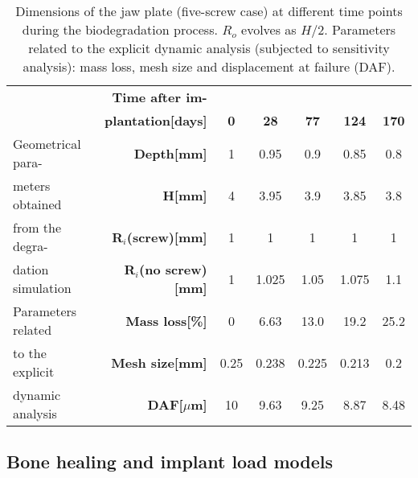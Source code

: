 \begin{table}[h]
\centering
\small
\begin{tabular}{|l|r|ccccc|}
\hline
                   & \textbf{Time after im-}          &            &             &             &              &              \\
                   & \textbf{plantation{[}days{]}}    & \textbf{0} & \textbf{28} & \textbf{77} & \textbf{124} & \textbf{170} \\ \hline
Geometrical para-  & \textbf{Depth{[}mm{]}}           & 1          & 0.95        & 0.9         & 0.85         & 0.8          \\
meters obtained    & \textbf{H{[}mm{]}}               & 4          & 3.95        & 3.9         & 3.85         & 3.8          \\
from the degra-    & \textbf{R$_i$(screw){[}mm{]}}    & 1          & 1           & 1           & 1            & 1            \\
dation simulation  & \textbf{R$_i$(no screw){[}mm{]}} & 1          & 1.025       & 1.05        & 1.075        & 1.1          \\ \hline
Parameters related & \textbf{Mass loss{[}\%{]}}       & 0          & 6.63        & 13.0        & 19.2         & 25.2         \\
to the explicit    & \textbf{Mesh size{[}mm{]}}       & 0.25       & 0.238      & 0.225        & 0.213        & 0.2          \\
dynamic analysis   & \textbf{{DAF}{[$\mu$}m{]}}         & 10         & 9.63        & 9.25        & 8.87         & 8.48         \\ \hline
\end{tabular}
\caption[Dimensions of the jaw plate at different time points during the biodegradation process]{Dimensions of the jaw plate (five-screw case) at different time points during the biodegradation process. $R_o$ evolves as $H/2$. Parameters related to the explicit dynamic analysis (subjected to sensitivity analysis): mass loss, mesh size and displacement at failure ({DAF}).}
\label{tab:BPdim}
\end{table}


\subsection{Bone healing and implant load models}
\label{sec:bonehealing}

